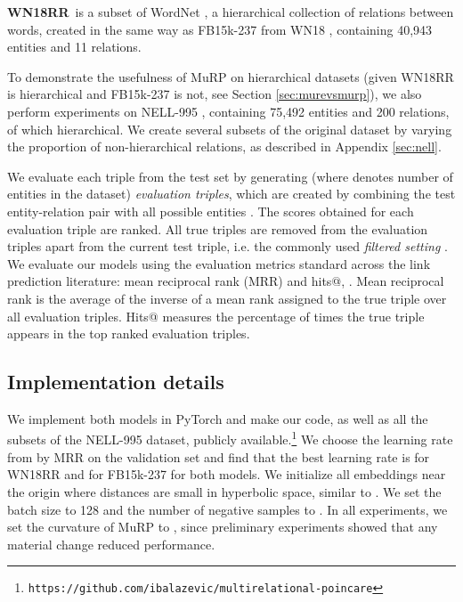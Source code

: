 \documentclass{article}
\newcommand{\keypoint}[1]{\vspace{0.cm}\noindent\textbf{#1}\,}
\begin{document}
\keypoint{WN18RR}  \cite{dettmers2018convolutional} is a subset of WordNet \cite{miller1995wordnet}, a hierarchical collection of relations between words, created in the same way as FB15k-237 from WN18 \cite{bordes2013translating}, containing 40,943 entities and 11 relations.

To demonstrate the usefulness of MuRP on hierarchical datasets (given WN18RR is hierarchical and FB15k-237 is not, see Section \ref{sec:murevsmurp}), we also perform experiments on NELL-995 \cite{xiong2017deeppath}, containing 75,492 entities and 200 relations,  of which hierarchical. We create several subsets of the original dataset by varying the proportion of non-hierarchical relations, as described in Appendix \ref{sec:nell}.


We evaluate each triple from the test set by generating  (where  denotes number of entities in the dataset) \textit{evaluation triples}, which are created by combining the test
entity-relation pair with all possible entities . The scores obtained for each evaluation triple are ranked. All true triples are removed from the evaluation triples apart from the current test triple, i.e. the commonly used \textit{filtered setting} \cite{bordes2013translating}. We evaluate our models using the evaluation metrics standard across the link prediction literature: mean reciprocal rank (MRR) and hits@, . Mean reciprocal rank is the average of the inverse of a mean rank assigned to the true triple over all  evaluation triples. Hits@ measures the percentage of times the true triple appears in the top  ranked evaluation triples. 

\subsection{Implementation details}

We implement both models in PyTorch and make our code, as well as all the subsets of the NELL-995 dataset, publicly available.\footnote{\texttt{https://github.com/ibalazevic/multirelational-poincare}}
We choose the learning rate from  by MRR on the validation set and find that the best learning rate is  for WN18RR and  for FB15k-237 for both models. We initialize all embeddings near the origin where distances are small in hyperbolic space, similar to \cite{nickel2017poincare}. We set the batch size to 128 and the number of negative samples to . In all experiments, we set the curvature of MuRP to , since preliminary experiments showed that any material change reduced performance.
\end{document}
